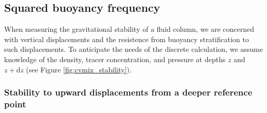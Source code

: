 \subsection{Squared buoyancy frequency}
\label{subsection:buoyancy-frequency-and-stability}

When measuring the gravitational stability of a fluid column, we are
concerned with vertical displacements and the resistence from buoyancy
stratification to such displacements.  To anticipate the needs of the
discrete calculation, we assume knowledge of the density, tracer
concentration, and pressure at depths $z$ and $z+\mathrm{d}z$ (see
Figure \ref{fig:cvmix_stability}).


\subsubsection{Stability to upward displacements from a deeper reference point}

